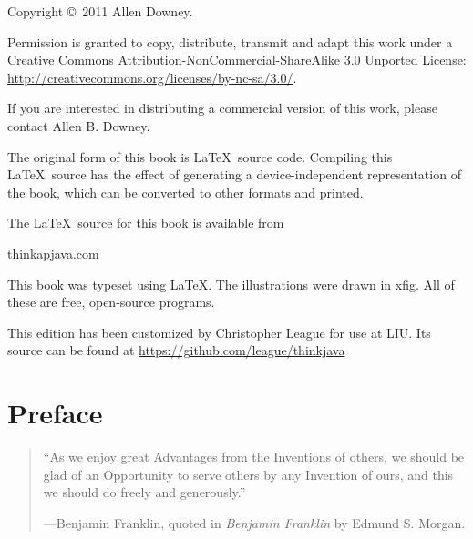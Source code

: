 \documentclass[12pt]{book}
\theoremstyle{definition}
\begin{document}
\begin{latexonly}
\begin{flushright}
\vfill

\end{flushright}


\pagebreak
\thispagestyle{empty}

Copyright \copyright ~2011 Allen Downey.

\vspace{0.25in}

Permission is granted to copy, distribute, transmit and adapt
this work under a Creative Commons 
Attribution-NonCommercial-ShareAlike 3.0 Unported License:
\url{http://creativecommons.org/licenses/by-nc-sa/3.0/}.

If you are interested in distributing a commercial version of this
work, please contact Allen B. Downey.

The original form of this book is \LaTeX\ source code.  Compiling this
\LaTeX\ source has the effect of generating a device-independent
representation of the book, which can be converted to other formats
and printed.

The \LaTeX\ source for this book is available from

\begin{verbatimtab}
      thinkapjava.com
\end{verbatimtab}

This book was typeset using \LaTeX .  The illustrations were
drawn in xfig.  All of these are free, open-source programs.

This edition has been customized by Christopher League for use at LIU.
Its source can be found at \url{https://github.com/league/thinkjava}


\vspace{0.25in}



\end{latexonly}

\fi

\setcounter{chapter}{0}
\chapter*{Preface}

\begin{quote}
``As we enjoy great Advantages from the Inventions of others,
we should be glad of an Opportunity to serve others by any
Invention of ours, and this we should do freely and generously.''

---Benjamin Franklin, quoted in {\em Benjamin Franklin} by
Edmund S. Morgan.
\end{quote}
\end{document}
